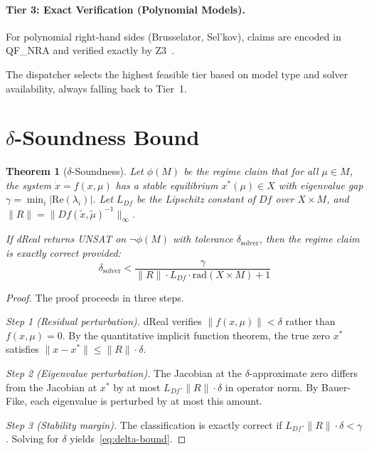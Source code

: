 \documentclass[11pt]{article}
\newtheorem{theorem}{Theorem}
\newcommand{\norm}[1]{\|#1\|}
\begin{document}
\paragraph{Tier 3: Exact Verification (Polynomial Models).}
For polynomial right-hand sides (Brusselator, Sel'kov), claims are encoded in QF\_NRA and verified exactly by Z3~\cite{demoura2008z3}.

The dispatcher selects the highest feasible tier based on model type and solver availability, always falling back to Tier~1.

\section{$\delta$-Soundness Bound}
\label{sec:delta}

\begin{theorem}[$\delta$-Soundness]
\label{thm:delta}
Let $\phi(M)$ be the regime claim that for all $\mu \in M$, the system $\dot{x} = f(x,\mu)$ has a stable equilibrium $x^*(\mu) \in X$ with eigenvalue gap $\gamma = \min_i |\mathrm{Re}(\lambda_i)|$.
Let $L_{Df}$ be the Lipschitz constant of $Df$ over $X \times M$, and $\norm{R} = \norm{Df(\tilde{x}, \tilde{\mu})^{-1}}_\infty$.

If dReal returns UNSAT on $\neg\phi(M)$ with tolerance $\delta_{\mathrm{solver}}$, then the regime claim is exactly correct provided:
\begin{equation}
\label{eq:delta-bound}
\delta_{\mathrm{solver}} < \frac{\gamma}{\norm{R} \cdot L_{Df} \cdot \mathrm{rad}(X \times M) + 1}
\end{equation}
\end{theorem}

\begin{proof}
The proof proceeds in three steps.

\emph{Step 1 (Residual perturbation).}
dReal verifies $\norm{f(x, \mu)} < \delta$ rather than $f(x,\mu) = 0$.
By the quantitative implicit function theorem, the true zero $x^*$ satisfies $\norm{x - x^*} \leq \norm{R} \cdot \delta$.

\emph{Step 2 (Eigenvalue perturbation).}
The Jacobian at the $\delta$-approximate zero differs from the Jacobian at $x^*$ by at most $L_{Df} \cdot \norm{R} \cdot \delta$ in operator norm.
By Bauer-Fike, each eigenvalue is perturbed by at most this amount.

\emph{Step 3 (Stability margin).}
The classification is exactly correct if $L_{Df} \cdot \norm{R} \cdot \delta < \gamma$.
Solving for $\delta$ yields~\eqref{eq:delta-bound}.
\end{proof}
\end{document}
